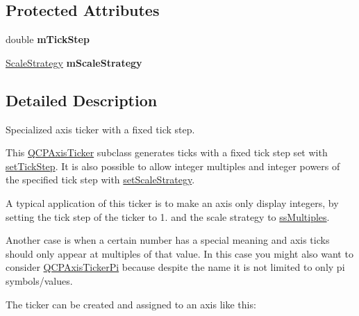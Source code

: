 \subsection*{Protected Attributes}
\begin{DoxyCompactItemize}
\item 
double {\bfseries m\+Tick\+Step}\hypertarget{classQCPAxisTickerFixed_a4aeef2d3eaa57ec56f422ab1f82175d2}{}\label{classQCPAxisTickerFixed_a4aeef2d3eaa57ec56f422ab1f82175d2}

\item 
\hyperlink{classQCPAxisTickerFixed_a15b3d38b935d404b1311eb85cfb6a439}{Scale\+Strategy} {\bfseries m\+Scale\+Strategy}\hypertarget{classQCPAxisTickerFixed_a61ead1590161769b0d36e09419e67b10}{}\label{classQCPAxisTickerFixed_a61ead1590161769b0d36e09419e67b10}

\end{DoxyCompactItemize}


\subsection{Detailed Description}
Specialized axis ticker with a fixed tick step. 



This \hyperlink{classQCPAxisTicker}{Q\+C\+P\+Axis\+Ticker} subclass generates ticks with a fixed tick step set with \hyperlink{classQCPAxisTickerFixed_a4bc83d85a4f81d4abdd3fa5042d7b833}{set\+Tick\+Step}. It is also possible to allow integer multiples and integer powers of the specified tick step with \hyperlink{classQCPAxisTickerFixed_acbc7c9bcd80b3dc3edee5f0519d301f6}{set\+Scale\+Strategy}.

A typical application of this ticker is to make an axis only display integers, by setting the tick step of the ticker to 1. and the scale strategy to \hyperlink{classQCPAxisTickerFixed_a15b3d38b935d404b1311eb85cfb6a439a22f651785f6412645837421896561104}{ss\+Multiples}.

Another case is when a certain number has a special meaning and axis ticks should only appear at multiples of that value. In this case you might also want to consider \hyperlink{classQCPAxisTickerPi}{Q\+C\+P\+Axis\+Ticker\+Pi} because despite the name it is not limited to only pi symbols/values.

The ticker can be created and assigned to an axis like this\+: 
\begin{DoxyCodeInclude}
\end{DoxyCodeInclude}


